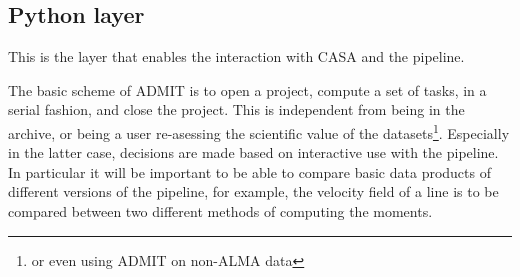 \documentclass{article}
\begin{document}
\subsection{Python layer}

This is the layer that enables the interaction with
CASA and the pipeline. 


The basic scheme of ADMIT is to open a project, compute a set of
tasks, in a serial fashion, and close the project. This is independent
from being in the archive, or being a user re-asessing the scientific
value of the datasets\footnote{or even using ADMIT on non-ALMA data}.
Especially in the latter case, decisions are
made based on interactive use with the pipeline. In particular it will
be important to be able to compare basic data products of different
versions of the pipeline, for example, the velocity field of a line is
to be compared between two different methods of computing the moments.
\end{document}
